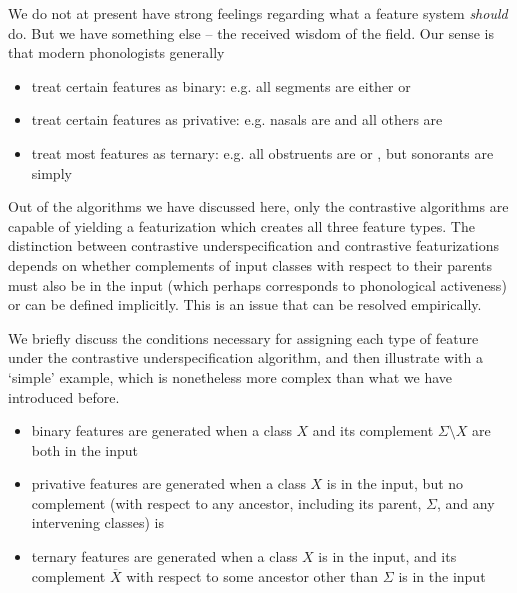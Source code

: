 \documentclass[11pt, oneside]{article}   	%
\begin{document}
We do not at present have strong feelings regarding what a feature system \textit{should} do. But we have something else -- the received wisdom of the field. Our sense is that modern phonologists generally \begin{itemize}
    \item treat certain features as binary: e.g. all segments are either  or 
    \item treat certain features as privative: e.g. nasals are  and all others are 
    \item treat most features as ternary: e.g. all obstruents are  or , but sonorants are simply 
    \end{itemize}
Out of the algorithms we have discussed here, only the contrastive algorithms are capable of yielding a featurization which creates all three feature types. The distinction between contrastive underspecification and contrastive featurizations depends on whether complements of input classes with respect to their parents must also be in the input (which perhaps corresponds to phonological activeness) or can be defined implicitly. This is an issue that can be resolved empirically.

We briefly discuss the conditions necessary for assigning each type of feature under the contrastive underspecification algorithm, and then illustrate with a `simple' example, which is nonetheless more complex than what we have introduced before. 
\begin{itemize}
    \item binary features are generated when a class $X$ and its complement $\Sigma \setminus X$ are both in the input
    \item privative features are generated when a class $X$ is in the input, but no complement (with respect to any ancestor, including its parent, $\Sigma$, and any intervening classes) is
    \item ternary features are generated when a class $X$ is in the input, and its complement $\overline{X}$ with respect to some ancestor other than $\Sigma$ is in the input
    \end{itemize}
\end{document}

